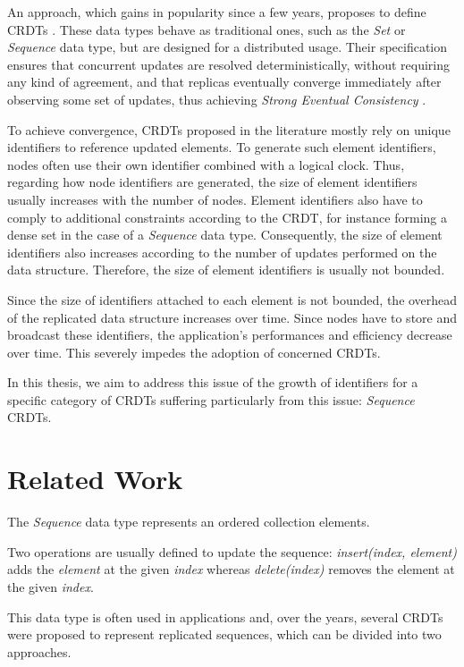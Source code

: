 \documentclass[sigplan]{acmart}
\begin{document}
An approach, which gains in popularity since a few years, proposes to define \acfp{CRDT} \cite{shapiro_2011_crdt}.
These data types behave as traditional ones, such as the \emph{Set} or \emph{Sequence} data type, but are designed for a distributed usage.
Their specification ensures that concurrent updates are resolved deterministically, without requiring any kind of agreement, and that replicas eventually converge immediately after observing some set of updates,
thus achieving \emph{Strong Eventual Consistency} \cite{shapiro_2011_crdt}.

To achieve convergence, \acp{CRDT} proposed in the literature mostly rely on unique identifiers to reference updated elements.
To generate such element identifiers, nodes often use their own identifier combined with a logical clock.
Thus, regarding how node identifiers are generated, the size of element identifiers usually increases with the number of nodes.
Element identifiers also have to comply to additional constraints according to the \ac{CRDT}, for instance forming a dense set in the case of a \emph{Sequence} data type.
Consequently, the size of element identifiers also increases according to the number of updates performed on the data structure.
Therefore, the size of element identifiers is usually not bounded.

Since the size of identifiers attached to each element is not bounded, the overhead of the replicated data structure increases over time.
Since nodes have to store and broadcast these identifiers, the application's performances and efficiency decrease over time.
This severely impedes the adoption of concerned \acp{CRDT}.

In this thesis, we aim to address this issue of the growth of identifiers for a specific category of \acp{CRDT} suffering particularly from this issue: \emph{Sequence} \acp{CRDT}.

\section{Related Work}

The \emph{Sequence} data type represents an ordered collection elements.

Two operations are usually defined to update the sequence:
\emph{insert(index, element)} adds the \emph{element} at the given \emph{index}
whereas \emph{delete(index)} removes the element at the given \emph{index}.

This data type is often used in applications and, over the years, several \acp{CRDT} \cite{shapiro:inria-00555588} were proposed to represent replicated sequences, which can be divided into two approaches.
\end{document}
